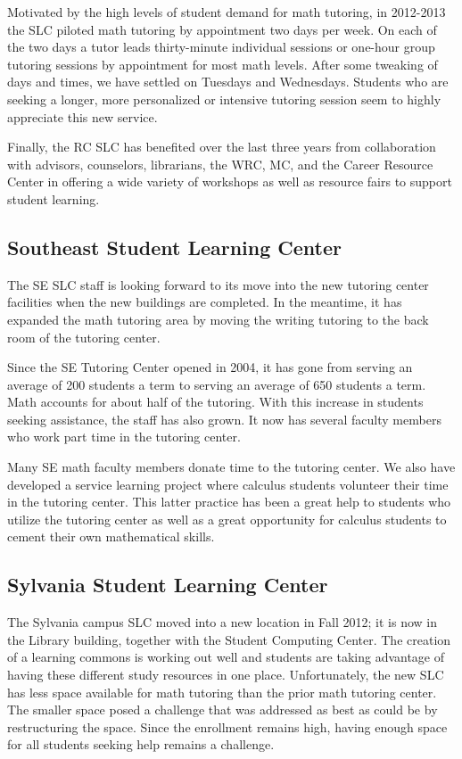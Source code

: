 Motivated by the high levels of student demand for math tutoring, in 2012-2013 the SLC piloted math tutoring by appointment two days per week. On each of the two days a tutor leads thirty-minute individual sessions or one-hour group tutoring sessions by appointment for most math levels.  After some tweaking of days and times, we have settled on Tuesdays and Wednesdays.  Students who are seeking a longer, more personalized or intensive tutoring session seem to highly appreciate this new service.  

Finally, the RC SLC has benefited over the last three years from collaboration with advisors, counselors, librarians, the WRC, MC, and the Career Resource Center in offering a wide variety of workshops as well as resource fairs to support student learning. 

\subsection{Southeast Student Learning Center}
The SE SLC staff is looking forward to its move into the new tutoring center facilities when the new buildings are completed. In the meantime, it has expanded the math tutoring area by moving the writing tutoring to the back room of the tutoring center.  

Since the SE Tutoring Center opened in 2004, it has gone from serving an average of 200 students a term to serving an average of 650 students a term. Math accounts for about half of the tutoring.  With this increase in students seeking assistance, the staff has also grown. It now has several faculty members who work part time in the tutoring center. 

Many SE math faculty members donate time to the tutoring center. We also have developed a service learning project where calculus students volunteer their time in the tutoring center. This latter practice has been a great help to students who utilize the tutoring center as well as a great opportunity for calculus students to cement their own mathematical skills.

\subsection{Sylvania Student Learning Center}
The Sylvania campus SLC moved into a new location in Fall 2012; it is now in the Library building, together with the Student Computing Center. The creation of a learning commons is working out well and students are taking advantage of having these different study resources in one place. Unfortunately, the new SLC has less space available for math tutoring than the prior math tutoring center.  The  smaller space posed a challenge that was addressed as best as could be by restructuring the space. Since the enrollment remains high, having enough space for all students seeking help remains a challenge.


